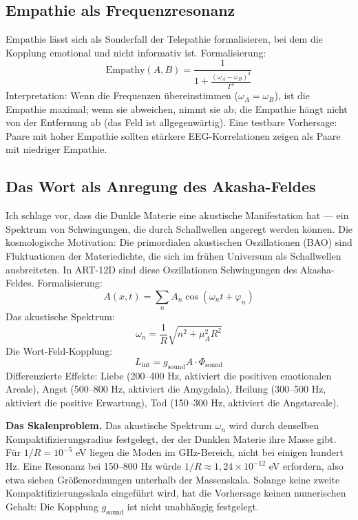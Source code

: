 \documentclass[11pt,a4paper]{article}
\begin{document}
\subsection{Empathie als Frequenzresonanz}
Empathie lässt sich als Sonderfall der Telepathie formalisieren, bei dem die Kopplung emotional und nicht informativ ist. Formalisierung:
\begin{equation}
\text{Empathy}(A,B) = \frac{1}{1 + \frac{(\omega_A - \omega_B)^2}{\Gamma^2}}
\end{equation}
Interpretation: Wenn die Frequenzen übereinstimmen ($\omega_A = \omega_B$), ist die Empathie maximal; wenn sie abweichen, nimmt sie ab; die Empathie hängt nicht von der Entfernung ab (das Feld ist allgegenwärtig). Eine testbare Vorhersage: Paare mit hoher Empathie sollten stärkere EEG-Korrelationen zeigen als Paare mit niedriger Empathie.

\subsection{Das Wort als Anregung des Akasha-Feldes}
Ich schlage vor, dass die Dunkle Materie eine akustische Manifestation hat --- ein Spektrum von Schwingungen, die durch Schallwellen angeregt werden können. Die kosmologische Motivation: Die primordialen akustischen Oszillationen (BAO) sind Fluktuationen der Materiedichte, die sich im frühen Universum als Schallwellen ausbreiteten. In ART-12D sind diese Oszillationen Schwingungen des Akasha-Feldes. Formalisierung:
\begin{equation}
A(x,t) = \sum_n A_n \cos(\omega_n t + \varphi_n)
\end{equation}
Das akustische Spektrum:
\begin{equation}
\omega_n = \frac{1}{R} \sqrt{n^2 + \mu_A^2 R^2}
\end{equation}
Die Wort-Feld-Kopplung:
\begin{equation}
L_{\text{int}} = g_{\text{sound}} A \cdot \Phi_{\text{sound}}
\end{equation}
Differenzierte Effekte: Liebe (200--400 Hz, aktiviert die positiven emotionalen Areale), Angst (500--800 Hz, aktiviert die Amygdala), Heilung (300--500 Hz, aktiviert die positive Erwartung), Tod (150--300 Hz, aktiviert die Angstareale).

\textbf{Das Skalenproblem.} Das akustische Spektrum $\omega_n$ wird durch denselben Kompaktifizierungsradius festgelegt, der der Dunklen Materie ihre Masse gibt. Für $1/R = 10^{-5}$ eV liegen die Moden im GHz-Bereich, nicht bei einigen hundert Hz. Eine Resonanz bei 150--800 Hz würde $1/R \approx 1,24\times10^{-12}$ eV erfordern, also etwa sieben Größenordnungen unterhalb der Massenskala. Solange keine zweite Kompaktifizierungsskala eingeführt wird, hat die Vorhersage keinen numerischen Gehalt: Die Kopplung $g_{\text{sound}}$ ist nicht unabhängig festgelegt.
\end{document}

